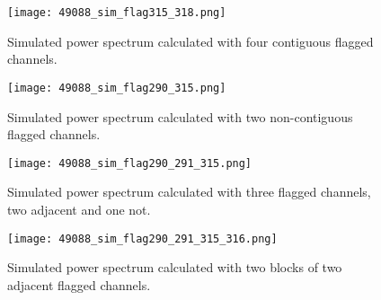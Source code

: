 \documentclass[12pt]{article}
\begin{document}
\begin{figure}[p]
	\centering
	\texttt{[image: 49088\_sim\_flag315\_318.png]}
	\caption[Model power spectrum calculated with flagged time integrations and four contiguous flagged channels]{Simulated power spectrum calculated with four contiguous flagged channels.}
	\label{fig:sim_flag_chan315_318}
\end{figure}

\begin{figure}[p]
	\centering
	\texttt{[image: 49088\_sim\_flag290\_315.png]}
	\caption[Model power spectrum calculated with flagged time integrations and two non-contiguous flagged channels]{Simulated power spectrum calculated with two non-contiguous flagged channels.}
	\label{fig:sim_flag_chan290_315}
\end{figure}

\begin{figure}[p]
	\centering
	\texttt{[image: 49088\_sim\_flag290\_291\_315.png]}
	\caption[Model power spectrum calculated with flagged time integrations and three flagged channels (two contiguous, one not)]{Simulated power spectrum calculated with three flagged channels, two adjacent and one not.}
	\label{fig:sim_flag_chan290_291_315}
\end{figure}

\begin{figure}[p]
	\centering
	\texttt{[image: 49088\_sim\_flag290\_291\_315\_316.png]}
	\caption[Model power spectrum calculated with flagged time integrations and four flagged channels (two blocks of two channels)]{Simulated power spectrum calculated with two blocks of two adjacent flagged channels.}
	\label{fig:sim_flag_chan290_291_315_316}
\end{figure}
\end{document}
